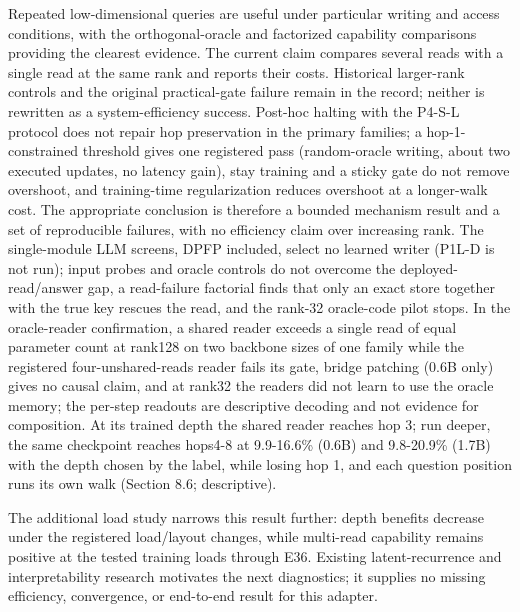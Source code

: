 Repeated low-dimensional queries are useful under particular writing and access
conditions, with the orthogonal-oracle and factorized capability comparisons
providing the clearest evidence. The current  %
claim compares several reads with a single read at the same rank and reports their
costs. Historical larger-rank controls and the original practical-gate  %
failure remain in the record; neither is rewritten as a system-efficiency success.
 Post-hoc halting with the P4-S-L protocol does not repair hop preservation in  %
the primary families; a hop-1-constrained threshold gives one registered pass (random-oracle
writing, about two executed updates, no latency gain), stay training and a sticky gate do not
remove overshoot, and training-time regularization reduces overshoot at a longer-walk cost.
The appropriate conclusion is therefore a bounded mechanism result and a set of
reproducible failures, with no efficiency claim over increasing rank.  %
The single-module LLM screens, DPFP included, select no learned writer (P1L-D is not run); input probes and oracle
controls do not overcome the deployed-read/\allowbreak{}answer gap, a read-failure factorial finds that only an
exact store together with the true key rescues the read, and the rank-32 oracle-code pilot stops.
In the oracle-reader confirmation, a shared reader exceeds a single read of equal parameter count at rank128 on two backbone sizes
of one family while the registered four-unshared-reads reader fails its gate, bridge patching (0.6B only) gives no causal claim, and at rank32 the readers did not
learn to use the oracle memory; the per-step readouts are descriptive decoding and not evidence for composition.
At its trained depth the shared reader reaches hop 3; run deeper, the same checkpoint reaches hops4-8 at 9.9-16.6\% (0.6B) and 9.8-20.9\% (1.7B) with the depth chosen by the label, while
losing hop 1, and each question position runs its own walk (Section 8.6; descriptive).  %

The additional load study narrows this result further: depth benefits decrease
under the registered load/\allowbreak{}layout changes, while multi-read capability remains
positive at the tested training loads through E36. Existing  %
latent-recurrence and interpretability research motivates the next diagnostics;
it supplies no missing efficiency, convergence, or end-to-end result for this adapter.

